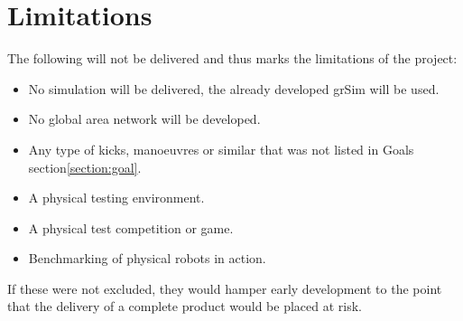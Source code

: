 \section{Limitations}
\label{section:limiations}

The following will not be delivered and thus marks the limitations of the project:
\begin{itemize}
    \item No simulation will be delivered, the already developed grSim will be used.
    \item No global area network will be developed.
    \item Any type of kicks, manoeuvres or similar that was not listed in Goals section\:\ref{section:goal}.
    \item A physical testing environment.
    \item A physical test competition or game.
    \item Benchmarking of physical robots in action.
\end{itemize}
If these were not excluded, they would hamper early development to the point that the delivery of a complete product would be placed at risk.



